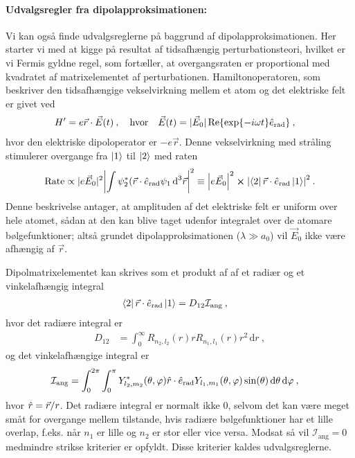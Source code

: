 \paragraph{Udvalgsregler fra dipolapproksimationen:} Vi kan også finde udvalgsreglerne på baggrund af dipolapproksimationen. Her starter vi med at kigge på resultat af tidsafhængig perturbationsteori, hvilket er vi Fermis gyldne regel, som fortæller, at overgangsraten er proportional med kvadratet af matrixelementet af perturbationen. Hamiltonoperatoren, som beskriver den tidsafhængige vekselvirkning mellem et atom og det elektriske felt er givet ved
\begin{align}
    H' &= e\Vec{r} \cdot \Vec{E}(t) \: , \quad \text{hvor} \quad \Vec{E}(t) = |\Vec{E}_0|\Re{\exp{-i\omega t}\Hat{e}_\text{rad}} \: ,
\end{align}
hvor den elektriske dipoloperator er $-e\Vec{r}$. Denne vekselvirkning med stråling stimulerer overgange fra $\ket{1}$ til $\ket{2}$ med raten
\begin{align}
    \text{Rate} \propto |e\Vec{E}_0|^2 \abs{\int \psi_2^* (\Vec{r} \cdot \Hat{e}_\text{rad} \psi_1 \, \text{d}^3\Vec{r}}^2 \equiv \abs{e\Vec{E}_0}^2 \cross \abs{\bra{2}\Vec{r}\cdot\Hat{e}_\text{rad}\ket{1}}^2 \: .
\end{align}
Denne beskrivelse antager, at amplituden af det elektriske felt er uniform over hele atomet, sådan at den kan blive taget udenfor integralet over de atomare bølgefunktioner; altså grundet \textsf{dipolapproksimationen} ($\lambda \gg a_0$) vil $\Vec{E}_0$ ikke være afhængig af $\Vec{r}$.

Dipolmatrixelementet kan skrives som et produkt af af et radiær og et vinkelafhængig integral
\begin{align}
    \bra{2}\Vec{r}\cdot\Hat{e}_\text{rad}\ket{1} &= D_{12}\mathcal{I}_\text{ang} \: ,
\end{align}
hvor det radiære integral er
\begin{align}
    D_{12} &= \int_0^\infty R_{n_2,l_2}(r) r R_{n_1,l_1}(r) r^2 \, \text{d}r \: ,
\end{align}
og det vinkelafhængige integral er
\begin{align} \label{eq:Q07_AngularIntegral}
    \mathcal{I}_\text{ang} &= \int_0^{2\pi}\int_0^\pi Y_{l_2,m_2}^*(\theta,\phi) \Hat{r} \cdot \Hat{e}_\text{rad} Y_{l_1,m_1}(\theta,\phi) \sin(\theta) \, \text{d}\theta \, \text{d}\phi \: ,
\end{align}
hvor $\Hat{r} = \Vec{r}/r$.
Det radiære integral er normalt ikke 0, selvom det kan være meget småt for overgange mellem tilstande, hvis radiære bølgefunktioner har et lille overlap, f.eks. når $n_1$ er lille og $n_2$ er stor eller vice versa. Modsat så vil $\mathcal{I}_\text{ang} = 0$ medmindre strikse kriterier er opfyldt. Disse kriterier kaldes udvalgsreglerne.\\

